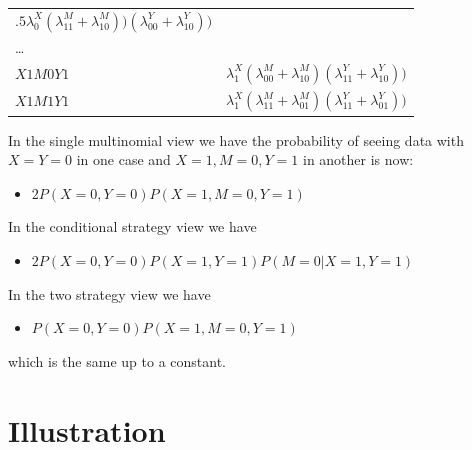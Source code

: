 \documentclass[
  12pt,
]{book}
\providecommand{\tightlist}{%
  \setlength{\itemsep}{0pt}\setlength{\parskip}{0pt}}
\begin{document}
\begin{longtable}[]{@{}ll@{}}
\begin{minipage}[t]{0.84\columnwidth}
\(.5\lambda^X_0(\lambda^M_{11}+\lambda^M_{10}))(\lambda^Y_{00}+\lambda^Y_{10}))\)\strut
\end{minipage}\tabularnewline
\begin{minipage}[t]{0.11\columnwidth}\raggedright
\ldots{}\strut
\end{minipage} & \begin{minipage}[t]{0.84\columnwidth}\raggedright
\strut
\end{minipage}\tabularnewline
\begin{minipage}[t]{0.11\columnwidth}\raggedright
\(X1M0Y1\)\strut
\end{minipage} & \begin{minipage}[t]{0.84\columnwidth}\raggedright
\(\lambda^X_1(\lambda^M_{00}+\lambda^M_{10})(\lambda^Y_{11}+\lambda^Y_{10}))\)\strut
\end{minipage}\tabularnewline
\begin{minipage}[t]{0.11\columnwidth}\raggedright
\(X1M1Y1\)\strut
\end{minipage} & \begin{minipage}[t]{0.84\columnwidth}\raggedright
\(\lambda^X_1(\lambda^M_{11}+\lambda^M_{01})(\lambda^Y_{11}+\lambda^Y_{01}))\)\strut
\end{minipage}\tabularnewline
\bottomrule
\end{longtable}

In the single multinomial view we have the probability of seeing data with \(X=Y=0\) in one case and \(X=1, M=0, Y=1\) in another is now:

\begin{itemize}
\tightlist
\item
  \(2P(X=0, Y=0)P(X=1, M=0, Y=1)\)
\end{itemize}

In the conditional strategy view we have

\begin{itemize}
\tightlist
\item
  \(2P(X=0, Y=0)P(X=1, Y=1)P(M=0 | X=1, Y=1)\)
\end{itemize}

In the two strategy view we have

\begin{itemize}
\tightlist
\item
  \(P(X=0, Y=0)P(X=1, M=0, Y=1)\)
\end{itemize}

which is the same up to a constant.

\hypertarget{illustration}{%
\section{Illustration}\label{illustration}}
\end{document}
